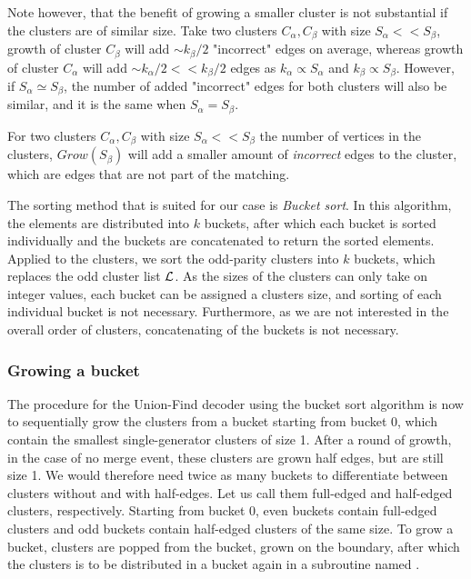 Note however, that the benefit of growing a smaller cluster is not substantial if the clusters are of similar size. Take two clusters $C_\alpha, C_\beta$ with size $S_\alpha <<S_\beta$, growth of cluster $C_\beta$ will add $\sim k_{\beta}/2$ "incorrect" edges on average, whereas growth of cluster $C_\alpha$ will add $\sim k_{\alpha}/2 << k_{\beta}/2$ edges as $k_{\alpha} \propto S_\alpha$ and $k_{\beta} \propto S_\beta$. However, if $S_\alpha \simeq S_\beta$, the number of added "incorrect" edges for both clusters will also be similar, and it is the same when $S_\alpha = S_\beta$.

\begin{lemma}\label{lem:incorrectedges}
  For two clusters $C_\alpha, C_\beta$ with size $S_\alpha << S_\beta$ the number of vertices in the clusters, $Grow(S_\beta)$ will add a smaller amount of \emph{incorrect} edges to the cluster, which are edges that are not part of the matching.
\end{lemma}

The sorting method that is suited for our case is \emph{Bucket sort}. In this algorithm, the elements are distributed into $k$ buckets, after which each bucket is sorted individually and the buckets are concatenated to return the sorted elements. Applied to the clusters, we sort the odd-parity clusters into $k$ buckets, which replaces the odd cluster list $\mathcal{L}$. As the sizes of the clusters can only take on integer values, each bucket can be assigned a clusters size, and sorting of each individual bucket is not necessary. Furthermore, as we are not interested in the overall order of clusters, concatenating of the buckets is not necessary.


\subsubsection{Growing a bucket}
The procedure for the Union-Find decoder using the bucket sort algorithm is now to sequentially grow the clusters from a bucket starting from bucket 0, which contain the smallest single-generator clusters of size 1. After a round of growth, in the case of no merge event, these clusters are grown half edges, but are still size 1. We would therefore need twice as many buckets to differentiate between clusters without and with half-edges. Let us call them full-edged and half-edged clusters, respectively. Starting from bucket 0, even buckets contain full-edged clusters and odd buckets contain half-edged clusters of the same size. To grow a bucket, clusters are popped from the bucket, grown on the boundary, after which the clusters is to be distributed in a bucket again in a subroutine named .

